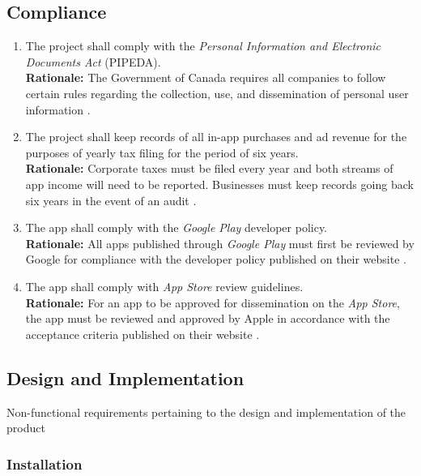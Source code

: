 \documentclass{article}
\begin{document}
\subsection{Compliance}
\label{sub:compliance}


\begin{enumerate}[align=left, label=\textbf{CO\arabic*.}]
    \item The project shall comply with the \emph{Personal Information and Electronic Documents Act} (PIPEDA).\\
          {\bf Rationale:} The Government of Canada requires all companies to follow certain rules regarding the collection, use, and dissemination of personal user information \cite{PIPEDA}.
    \item The project shall keep records of all in-app purchases and ad revenue for the purposes of yearly tax filing for the period of six years.\\
          {\bf Rationale:} Corporate taxes must be filed every year and both streams of app income will need to be reported. Businesses must keep records going back six years in the event of an audit \cite{6Year}.
    \item The app shall comply with the \emph{Google Play} developer policy.\\
          {\bf Rationale:} All apps published through \emph{Google Play} must first be reviewed by Google for compliance with the developer policy published on their website \cite{GooglePlay}.
    \item The app shall comply with \emph{App Store} review guidelines.\\
          {\bf Rationale:} For an app to be approved for dissemination on the \emph{App Store}, the app must be reviewed and approved by Apple in accordance with the acceptance criteria published on their website \cite{AppStore}.
\end{enumerate}

\subsection{Design and Implementation}

Non-functional requirements pertaining to the design and implementation of the product

\subsubsection{Installation}
\label{ssub:installation}
\end{document}

